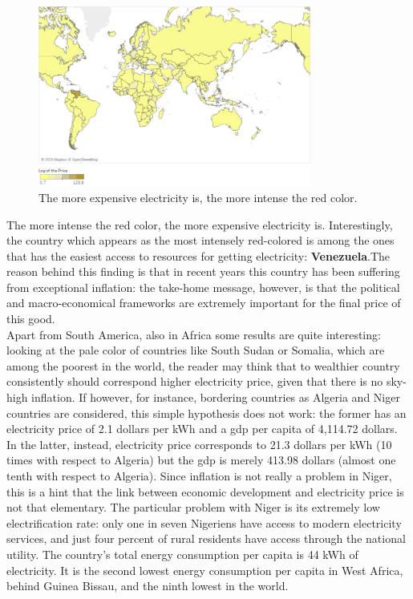 \documentclass{book}
\begin{document}
\bigskip
\begin{figure}[H]
\begin{center}
\captionsetup{justification=centering}
\includegraphics[width=0.8\textwidth]{Images/world2020.png}
\caption{The more expensive electricity is, the more intense the red color. }
\end{center}
\end{figure}
\bigskip

The more intense the red color, the more expensive electricity is. Interestingly, the country which appears as the most intensely red-colored is among the ones that has the easiest access to resources for getting electricity: \textbf{Venezuela}.The reason behind this finding is that in recent years this country has been suffering from exceptional inflation: the take-home message, however, is that the political and macro-economical frameworks are extremely important for the final price of this good.\\

Apart from South America, also in Africa some results are quite interesting: looking at the pale color of countries like South Sudan or Somalia, which are among the poorest in the world, the reader may think that to wealthier country consistently should correspond higher electricity price, given that there is no sky-high inflation. If however, for instance, bordering countries as Algeria and Niger countries are considered, this simple hypothesis does not work: the former has an electricity price of 2.1 dollars per kWh and a gdp per capita of 4,114.72 dollars. In the latter, instead, electricity price corresponds to 21.3 dollars per kWh (10 times with respect to Algeria) but the gdp is merely 413.98 dollars (almost one tenth with respect to Algeria). Since inflation is not really a problem in Niger, this is a hint that the link between economic development and electricity price is not that elementary. The particular problem with Niger is its extremely low electrification rate: only one in seven Nigeriens have access to modern electricity services, and just four percent of rural residents have access through the national utility. The country's total energy consumption per capita is 44 kWh of electricity. It is the second lowest energy consumption per capita in West Africa, behind Guinea Bissau, and the ninth lowest in the world. 
\end{document}
